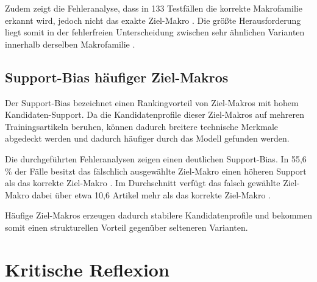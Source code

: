 Zudem zeigt die Fehleranalyse, dass in 133 Testfällen die korrekte Makrofamilie erkannt wird, jedoch nicht das exakte Ziel-Makro \parencite{EPLAN-Makros}.
Die größte Herausforderung liegt somit in der fehlerfreien Unterscheidung zwischen sehr ähnlichen Varianten innerhalb derselben Makrofamilie \parencite{LTR_Configuration_Test_Series}.

\subsection{Support-Bias häufiger Ziel-Makros}

Der Support-Bias bezeichnet einen Rankingvorteil von Ziel-Makros mit hohem Kandidaten-Support. Da die Kandidatenprofile dieser Ziel-Makros auf mehreren Trainingsartikeln beruhen, können dadurch breitere technische Merkmale abgedeckt werden und dadurch häufiger durch das Modell gefunden werden.

Die durchgeführten Fehleranalysen zeigen einen deutlichen Support-Bias. In 55,6\,\% der Fälle besitzt das fälschlich ausgewählte Ziel-Makro \parencite{EPLAN-Makros} einen höheren Support als das korrekte Ziel-Makro \parencite{EPLAN-Makros}.
Im Durchschnitt verfügt das falsch gewählte Ziel-Makro dabei über etwa 10,6 Artikel mehr als das korrekte Ziel-Makro \parencite{LTR_Configuration_Test_Series}.

Häufige Ziel-Makros \parencite{EPLAN-Makros} erzeugen dadurch stabilere Kandidatenprofile und bekommen somit einen strukturellen Vorteil gegenüber selteneren Varianten.



\section{Kritische Reflexion}






